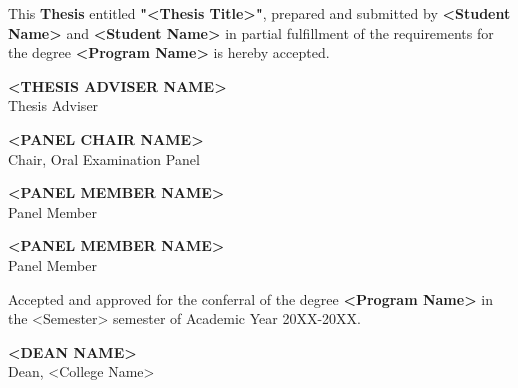 \begin{approvalPage}

  This \textbf{Thesis} entitled \textbf{"<Thesis Title>"}, prepared and submitted by \textbf{<Student Name>} and \textbf{<Student Name>} in partial fulfillment of the requirements for the degree \textbf{<Program Name>} is hereby accepted.

  \vspace{2cm}

  \centering

  \textbf{<THESIS ADVISER NAME>} \\
  Thesis Adviser

  \vspace{1.5cm}

  \textbf{<PANEL CHAIR NAME>} \\
  Chair, Oral Examination Panel

  \vspace{1.5cm}

  \noindent
  \begin{minipage}[t]{0.45\textwidth}
    \centering
    \textbf{<PANEL MEMBER NAME>} \\
    Panel Member
  \end{minipage}%
  \hfill
  \begin{minipage}[t]{0.45\textwidth}
    \centering
    \textbf{<PANEL MEMBER NAME>} \\
    Panel Member
  \end{minipage}

  \vspace{2cm}

  \centering
  Accepted and approved for the conferral of the degree \textbf{<Program Name>} in the <Semester> semester of Academic Year 20XX-20XX.

  \vspace{1.5cm}

  \noindent
  \hfill
  \begin{minipage}[t]{0.45\textwidth}
    \centering
    \textbf{<DEAN NAME>} \\
    Dean, <College Name>
  \end{minipage}

  \clearpage

\end{approvalPage}
